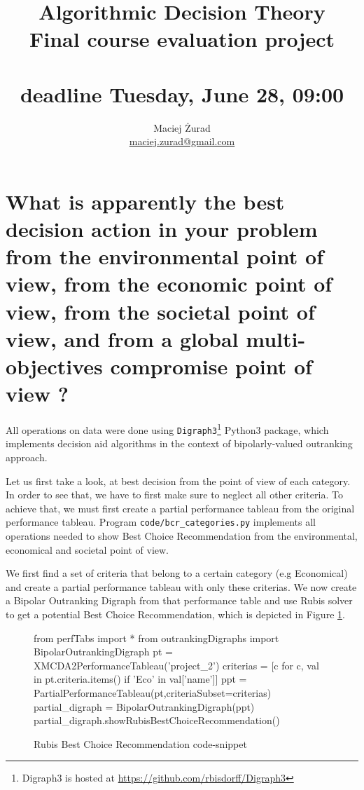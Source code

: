 \documentclass[a4paper]{article}
\begin{document}
 \title{\textbf{Algorithmic Decision Theory} \\ Final course evaluation project
 \\  ~\\ \normalsize{deadline Tuesday, June 28, 09:00}}
 \author{Maciej Żurad \\ \url{maciej.zurad@gmail.com}}

\date{}

\maketitle



\section{What is apparently the best decision action in your problem from the environmental point of view, from the economic point of view, from the societal point of view, and from a global multi-objectives compromise point of view ?}

All operations on data were done using \texttt{Digraph3}\footnote{Digraph3 is hosted at \url{https://github.com/rbisdorff/Digraph3}} Python3 package, which implements decision aid algorithms in the context of bipolarly-valued outranking approach.

Let us first take a look, at best decision from the point of view of each category. In order to see that, we have to first make sure to neglect all other criteria. To achieve that, we must first create a partial performance tableau from the original performance tableau. Program \texttt{code/bcr\_categories.py} implements all operations needed to show Best Choice Recommendation from the environmental, economical and societal point of view.

We first find a set of criteria that belong to a certain category (e.g Economical) and create a partial performance tableau with only these criterias. We now create a Bipolar Outranking Digraph from that performance table and use Rubis solver to get a potential Best Choice Recommendation, which is depicted in Figure \ref{lst:rubis}.

\begin{figure}[H]
\begin{center}
\begin{python}
from perfTabs import *
from outrankingDigraphs import BipolarOutrankingDigraph
pt = XMCDA2PerformanceTableau('project_2')
criterias = [c for c, val in pt.criteria.items() if 'Eco' in val['name']]
ppt = PartialPerformanceTableau(pt,criteriaSubset=criterias)
partial_digraph = BipolarOutrankingDigraph(ppt)
partial_digraph.showRubisBestChoiceRecommendation()
\end{python}
\end{center}
\caption{Rubis Best Choice Recommendation code-snippet}
\label{lst:rubis}
\end{figure}
\end{document}
